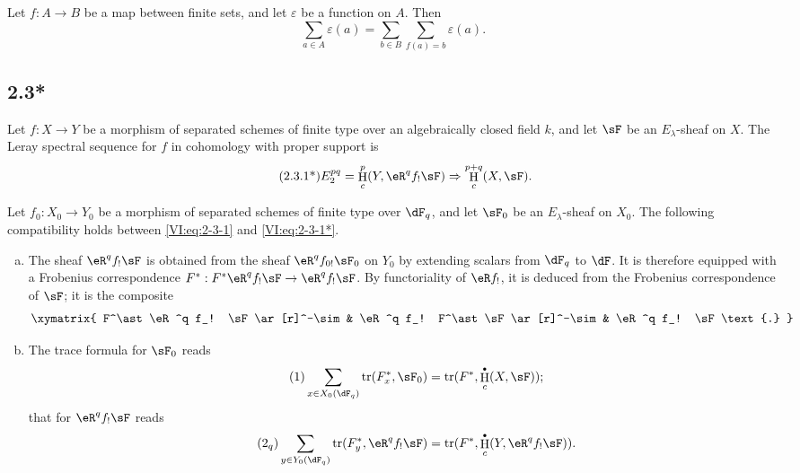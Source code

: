 \documentclass[12pt,oneside,english]{smfbook}
\DeclareMathOperator{\h}{H}
\DeclareMathOperator{\tr}{tr}
\let\oldbullet\bullet
\renewcommand{\bullet}{\textnormal{\tiny$\oldbullet$}}
\begin{document}
\subsection{}\label{VI:2-3}

Let $f:A\to B$ be a map between finite sets, and let $\varepsilon$ be a function on $A$. Then
\begin{equation*}\tag{2.3.1}\label{VI:eq:2-3-1}
  \sum_{a\in A} \varepsilon(a) = \sum_{b\in B} \sum_{f(a)=b} \varepsilon(a) \text{.}
\end{equation*}

\subsection*{2.3*}\label{VI:2-3*}

Let $f:X\to Y$ be a morphism of separated schemes of finite type over an algebraically closed field $k$, and let $\sF$ be an $E_\lambda$-sheaf on $X$. The Leray spectral sequence for $f$ in cohomology with proper support is
\begin{align*}\tag{2.3.1*}\label{VI:eq:2-3-1*}
  E_2^{p q} = \h_c^p(Y,\eR^q f_! \sF) \Rightarrow \h_c^{p+q}(X,\sF) \text{.}
\end{align*}

Let $f_0:X_0\to Y_0$ be a morphism of separated schemes of finite type over $\dF_q$, and let $\sF_0$ be an $E_\lambda$-sheaf on $X_0$. The following compatibility holds between \eqref{VI:eq:2-3-1} and \eqref{VI:eq:2-3-1*}.

\begin{enumerate}[a)]
  \item The sheaf $\eR^qf_!\sF$ is obtained from the sheaf $\eR^qf_{0!}\sF_0$ on $Y_0$ by extending scalars from $\dF_q$ to $\dF$. It is therefore equipped with a Frobenius correspondence $F^\ast:F^\ast\eR^qf_!\sF\to\eR^qf_!\sF$. By functoriality of $\eR f_!$, it is deduced from the Frobenius correspondence of $\sF$; it is the composite
    \[\xymatrix{
      F^\ast \eR^q f_! \sF \ar[r]^-\sim
        & \eR^q f_! F^\ast \sF \ar[r]^-\sim
        & \eR^q f_! \sF \text{.}
    }\]
  \item The trace formula for $\sF_0$ reads
    \begin{align*}\tag{1}\label{VI:eq:1}
      \sum_{x\in X_0(\dF_q)} \tr(F_x^\ast,\sF_0)
      = \tr(F^\ast,\h_c^\bullet(X,\sF)) \text{;}
    \end{align*}
    that for $\eR^qf_!\sF$ reads
    \begin{align*}\tag{2$_q$}\label{VI:eq:2_q}
      \sum_{y\in Y_0(\dF_q)} \tr(F_y^\ast,\eR^q f_! \sF)
      = \tr(F^\ast,\h_c^\bullet(Y,\eR^q f_! \sF)) \text{.}
    \end{align*}
\end{enumerate}
\end{document}

